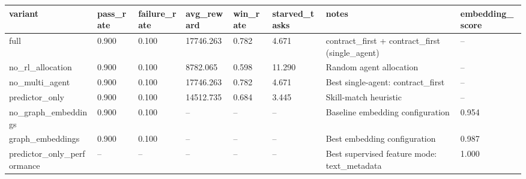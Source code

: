 \begin{tabular}{llllllll}
\toprule
variant & pass\_rate & failure\_rate & avg\_reward & win\_rate & starved\_tasks & notes & embedding\_score \\
\midrule
full & 0.900 & 0.100 & 17746.263 & 0.782 & 4.671 & contract\_first + contract\_first (single\_agent) & -- \\
no\_rl\_allocation & 0.900 & 0.100 & 8782.065 & 0.598 & 11.290 & Random agent allocation & -- \\
no\_multi\_agent & 0.900 & 0.100 & 17746.263 & 0.782 & 4.671 & Best single-agent: contract\_first & -- \\
predictor\_only & 0.900 & 0.100 & 14512.735 & 0.684 & 3.445 & Skill-match heuristic & -- \\
no\_graph\_embeddings & 0.900 & 0.100 & -- & -- & -- & Baseline embedding configuration & 0.954 \\
graph\_embeddings & 0.900 & 0.100 & -- & -- & -- & Best embedding configuration & 0.987 \\
predictor\_only\_performance & -- & -- & -- & -- & -- & Best supervised feature mode: text\_metadata & 1.000 \\
\bottomrule
\end{tabular}
